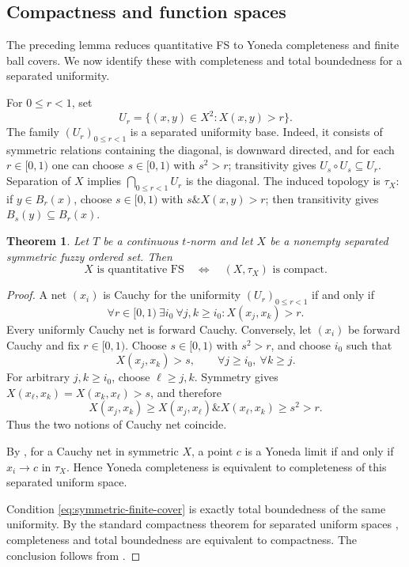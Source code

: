\documentclass[preprint,3p,times]{elsarticle}
\newtheorem{theorem}{Theorem}[section]
\theoremstyle{definition}
\theoremstyle{remark}
\newcommand{\tn}{\mathbin{\&}}
\numberwithin{equation}{section}
\begin{document}
\subsection{Compactness and function spaces}
The preceding lemma reduces quantitative FS to Yoneda completeness and finite ball covers. We now identify these with completeness and total boundedness for a separated uniformity.

For \(0\leq r<1\), set
\[
 U_r=\{(x,y)\in X^2:X(x,y)>r\}.
\]
The family \((U_r)_{0\leq r<1}\) is a separated uniformity base. Indeed, it consists of symmetric relations containing the diagonal, is downward directed, and for each \(r\in[0,1)\) one can choose \(s\in[0,1)\) with \(s^2>r\); transitivity gives \(U_s\circ U_s\subseteq U_r\). Separation of \(X\) implies \(\bigcap_{0\leq r<1}U_r\) is the diagonal. The induced topology is \(\tau_X\): if \(y\in B_r(x)\), choose \(s\in[0,1)\) with \(s\tn X(x,y)>r\); then transitivity gives \(B_s(y)\subseteq B_r(x)\).

\begin{theorem}\label{thm:compact-symmetric}
Let \(T\) be a continuous \(t\)-norm and let \(X\) be a nonempty separated symmetric fuzzy ordered set. Then
\[
 X\text{ is quantitative FS}
 \quad\Longleftrightarrow\quad
 (X,\tau_X)\text{ is compact}.
\]
\end{theorem}

\begin{proof}
A net \((x_i)\) is Cauchy for the uniformity \((U_r)_{0\leq r<1}\) if and only if
\[
 \forall r\in[0,1)\ \exists i_0\ \forall j,k\geq i_0:
 X(x_j,x_k)>r.
\]
Every uniformly Cauchy net is forward Cauchy. Conversely, let \((x_i)\) be forward Cauchy and fix \(r\in[0,1)\). Choose \(s\in[0,1)\) with \(s^2>r\), and choose \(i_0\) such that
\[
 X(x_j,x_k)>s,
 \qquad \forall j\geq i_0,\ \forall k\geq j.
\]
For arbitrary \(j,k\geq i_0\), choose \(\ell\geq j,k\). Symmetry gives \(X(x_\ell,x_k)=X(x_k,x_\ell)>s\), and therefore
\[
 X(x_j,x_k)
 \geq X(x_j,x_\ell)\tn X(x_\ell,x_k)
 \geq s^2>r.
\]
Thus the two notions of Cauchy net coincide.

By \cite[Lemma~8.11 and Proposition~9.2]{Zhang2024}, for a Cauchy net in symmetric \(X\), a point \(c\) is a Yoneda limit if and only if \(x_i\to c\) in \(\tau_X\). Hence Yoneda completeness is equivalent to completeness of this separated uniform space.

Condition \eqref{eq:symmetric-finite-cover} is exactly total boundedness of the same uniformity. By the standard compactness theorem for separated uniform spaces \cite[Chapter~6]{Kelley2017}, completeness and total boundedness are equivalent to compactness. The conclusion follows from .
\end{proof}
\end{document}
